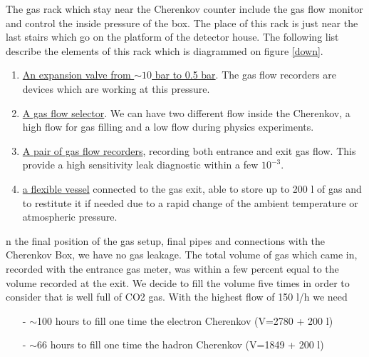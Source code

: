 \documentclass[12pt]{article}
\begin{document}

The gas rack which stay near the Cherenkov counter include the gas flow
 monitor and control the inside pressure of the box. The place of this rack is
just near the last stairs which go on the platform of the detector house. The
following list describe the elements of this rack which is diagrammed on
 figure \ref{down}.
\begin{enumerate}
\item \underline{An expansion valve from $\sim 10$ bar to 0.5 bar}. The
 gas flow recorders are devices which are working at this pressure.
\item \underline{A gas flow selector}. We can have two different flow
 inside the Cherenkov, a high flow for gas filling and a low flow 
during physics experiments. 
\item \underline{A pair of gas flow recorders}, recording both entrance 
and exit gas flow.
This provide a high sensitivity leak diagnostic within a few $10^{-3}$.
\item \underline{a flexible vessel} connected to the gas exit, able to 
store up to 200 l of gas and to restitute it if needed due to a rapid change 
of the ambient temperature or atmospheric pressure.
\end{enumerate}


n the final position of the gas setup, final pipes and connections with the
 Cherenkov Box, we have no gas leakage. The total volume of gas which came in, 
recorded with the entrance gas meter, was within a few percent equal to the
volume recorded at the exit.
We decide to fill the volume five times 
in order to consider that is well full of CO2 gas. 
With the highest flow of 150 l/h we need 
\begin{itemize}
\item[-] $\sim$100 hours to fill one time the electron Cherenkov
 (V=2780 + 200 l)
\item[-] $\sim$66 hours to fill one time the hadron Cherenkov 
(V=1849 + 200 l)
\end{itemize}
\end{document}
